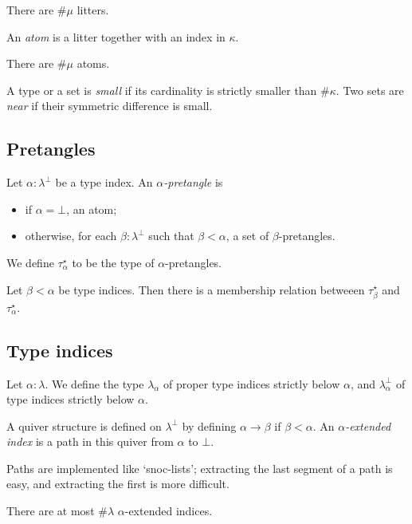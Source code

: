 \documentclass{article}
\begin{document}
\begin{lemma}
    There are \( \#\mu \) litters.
\end{lemma}
\begin{definition}
    An \emph{atom} is a litter together with an index in \( \kappa \).
\end{definition}
\begin{lemma}
    There are \( \#\mu \) atoms.
\end{lemma}
\begin{definition}
    A type or a set is \emph{small} if its cardinality is strictly smaller than \( \#\kappa \).
    Two sets are \emph{near} if their symmetric difference is small.
\end{definition}

\subsection{Pretangles}

\begin{definition}
    Let \( \alpha : \lambda^\bot \) be a type index.
    An \emph{\( \alpha \)-pretangle} is
    \begin{itemize}
        \item if \( \alpha = \bot \), an atom;
        \item otherwise, for each \( \beta : \lambda^\bot \) such that \( \beta < \alpha \), a set of \( \beta \)-pretangles.
    \end{itemize}
    We define \( \tau_\alpha^\star \) to be the type of \( \alpha \)-pretangles.
\end{definition}
\begin{definition}
    Let \( \beta < \alpha \) be type indices.
    Then there is a membership relation betweeen \( \tau_\beta^\star \) and \( \tau_\alpha^\star \).
\end{definition}

\subsection{Type indices}

\begin{definition}
    Let \( \alpha : \lambda \).
    We define the type \( \lambda_\alpha \) of proper type indices strictly below \( \alpha \), and \( \lambda_\alpha^\bot \) of type indices strictly below \( \alpha \).
\end{definition}
\begin{definition}
    A quiver structure is defined on \( \lambda^\bot \) by defining \( \alpha \longrightarrow \beta \) if \( \beta < \alpha \).
    An \emph{\( \alpha \)-extended index} is a path in this quiver from \( \alpha \) to \( \bot \).
\end{definition}
\begin{remark}
    Paths are implemented like `snoc-lists'; extracting the last segment of a path is easy, and extracting the first is more difficult.
\end{remark}
\begin{lemma}
    There are at most \( \#\lambda \) \( \alpha \)-extended indices.
\end{lemma}
\end{document}
